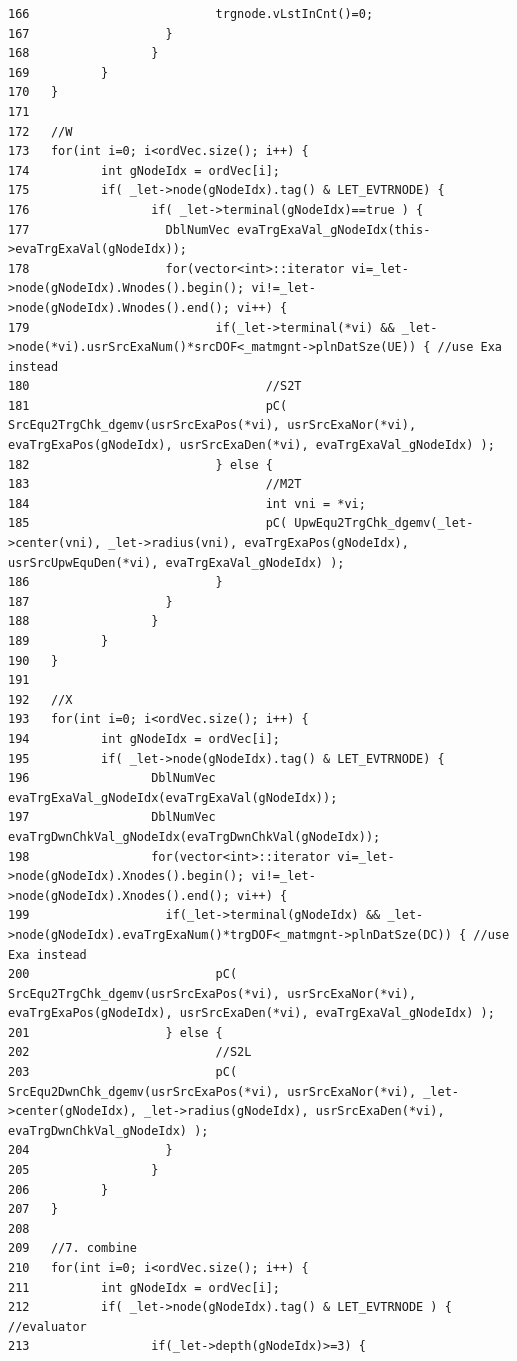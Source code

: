 \begin{verbatim}
166                          trgnode.vLstInCnt()=0;
167                   }
168                 }
169          }
170   }
171 
172   //W
173   for(int i=0; i<ordVec.size(); i++) {
174          int gNodeIdx = ordVec[i];
175          if( _let->node(gNodeIdx).tag() & LET_EVTRNODE) {
176                 if( _let->terminal(gNodeIdx)==true ) {
177                   DblNumVec evaTrgExaVal_gNodeIdx(this->evaTrgExaVal(gNodeIdx));
178                   for(vector<int>::iterator vi=_let->node(gNodeIdx).Wnodes().begin(); vi!=_let->node(gNodeIdx).Wnodes().end(); vi++) {
179                          if(_let->terminal(*vi) && _let->node(*vi).usrSrcExaNum()*srcDOF<_matmgnt->plnDatSze(UE)) { //use Exa instead
180                                 //S2T
181                                 pC( SrcEqu2TrgChk_dgemv(usrSrcExaPos(*vi), usrSrcExaNor(*vi), evaTrgExaPos(gNodeIdx), usrSrcExaDen(*vi), evaTrgExaVal_gNodeIdx) );
182                          } else {
183                                 //M2T
184                                 int vni = *vi;          
185                                 pC( UpwEqu2TrgChk_dgemv(_let->center(vni), _let->radius(vni), evaTrgExaPos(gNodeIdx), usrSrcUpwEquDen(*vi), evaTrgExaVal_gNodeIdx) );
186                          }
187                   }
188                 }
189          }
190   }
191 
192   //X
193   for(int i=0; i<ordVec.size(); i++) {
194          int gNodeIdx = ordVec[i];
195          if( _let->node(gNodeIdx).tag() & LET_EVTRNODE) {
196                 DblNumVec evaTrgExaVal_gNodeIdx(evaTrgExaVal(gNodeIdx));
197                 DblNumVec evaTrgDwnChkVal_gNodeIdx(evaTrgDwnChkVal(gNodeIdx));
198                 for(vector<int>::iterator vi=_let->node(gNodeIdx).Xnodes().begin(); vi!=_let->node(gNodeIdx).Xnodes().end(); vi++) {
199                   if(_let->terminal(gNodeIdx) && _let->node(gNodeIdx).evaTrgExaNum()*trgDOF<_matmgnt->plnDatSze(DC)) { //use Exa instead
200                          pC( SrcEqu2TrgChk_dgemv(usrSrcExaPos(*vi), usrSrcExaNor(*vi), evaTrgExaPos(gNodeIdx), usrSrcExaDen(*vi), evaTrgExaVal_gNodeIdx) );
201                   } else {
202                          //S2L
203                          pC( SrcEqu2DwnChk_dgemv(usrSrcExaPos(*vi), usrSrcExaNor(*vi), _let->center(gNodeIdx), _let->radius(gNodeIdx), usrSrcExaDen(*vi), evaTrgDwnChkVal_gNodeIdx) );
204                   }
205                 }
206          }
207   }
208 
209   //7. combine
210   for(int i=0; i<ordVec.size(); i++) {
211          int gNodeIdx = ordVec[i];
212          if( _let->node(gNodeIdx).tag() & LET_EVTRNODE ) { //evaluator  
213                 if(_let->depth(gNodeIdx)>=3) {

\end{verbatim}
